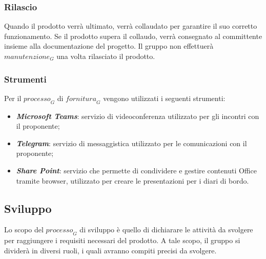 \subsubsection{Rilascio}
Quando il prodotto verrà ultimato, verrà collaudato per garantire il suo corretto funzionamento. Se il prodotto supera il collaudo, verrà consegnato al committente insieme alla documentazione del progetto. 
Il gruppo non effettuerà $\textit{manutenzione}_G$ una volta rilasciato il prodotto.
\subsubsection{Strumenti}
Per il $\textit{processo}_G$ di $\textit{fornitura}_G$ vengono utilizzati i seguenti strumenti:
\begin{itemize}
    \item \emph{\textbf{Microsoft Teams}}: servizio di videoconferenza utilizzato per gli incontri con il proponente;
    \item \emph{\textbf{Telegram}}: servizio di messaggistica utilizzato per le comunicazioni con il proponente;
    \item \emph{\textbf{Share Point}}: servizio che permette di condividere e gestire contenuti Office tramite browser, utilizzato per creare le presentazioni per i diari di bordo.
\end{itemize}

\subsection{Sviluppo}
Lo scopo del $\textit{processo}_G$ di sviluppo è quello di dichiarare le attività da svolgere per raggiungere i requisiti necessari del prodotto.
A tale scopo, il gruppo si dividerà in diversi ruoli, i quali avranno compiti precisi da svolgere.
